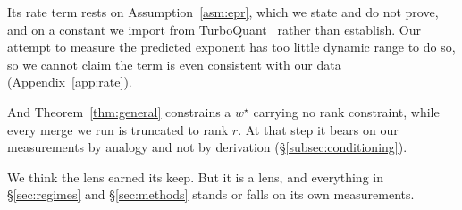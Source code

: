 Its rate term rests on Assumption~\ref{asm:epr}, which we state and do not
prove, and on a constant we import from TurboQuant~\citep{zandieh2025turboquant}
rather than establish. Our attempt to measure the predicted exponent has too
little dynamic range to do so, so we cannot claim the term is even consistent
with our data (Appendix~\ref{app:rate}).

And Theorem~\ref{thm:general} constrains a $w^\star$ carrying no rank
constraint, while every merge we run is truncated to rank $r$. At that step it
bears on our measurements by analogy and not by derivation
(\S\ref{subsec:conditioning}).

We think the lens earned its keep. But it is a lens, and everything in
\S\ref{sec:regimes} and \S\ref{sec:methods} stands or falls on its own
measurements.
